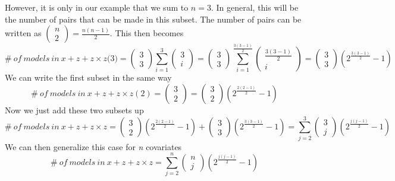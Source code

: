 However, it is only in our example that we sum to $n=3$. In general, this will be the number of pairs that can be made in this subset. The number of pairs can be written as $\left( \begin{array}{c}
n \\ 
2 \end{array}
\right)=\frac{n\left(n-1\right)}{2}$. This then becomes
\[\#\ of\ models\ in\ x + z + z \times z\textit{(3)}=\left( \begin{array}{c}
3 \\ 
3 \end{array}
\right)\sum^3_{i=1}{\left( \begin{array}{c}
3 \\ 
i \end{array}
\right)}=\left( \begin{array}{c}
3 \\ 
3 \end{array}
\right)\sum^{\frac{3\left(3-1\right)}{2}}_{i=1}{\left( \begin{array}{c}
\frac{3\left(3-1\right)}{2} \\ 
i \end{array}
\right)}=\left( \begin{array}{c}
3 \\ 
3 \end{array}
\right)\left(2^{\frac{3\left(3-1\right)}{2}}-1\right)\] 
We can write the first subset in the same way
\[\#\ of\ models\ in\ x + z + z \times z(2)=\left( \begin{array}{c}
3 \\ 
2 \end{array}
\right)=\left( \begin{array}{c}
3 \\ 
2 \end{array}
\right)\left(2^{\frac{2\left(2-1\right)}{2}}-1\right)\] 
Now we just add these two subsets up
\[\#\ of\ models\ in\ x + z + z \times z=\left( \begin{array}{c}
3 \\ 
2 \end{array}
\right)\left(2^{\frac{2\left(2-1\right)}{2}}-1\right)+\left( \begin{array}{c}
3 \\ 
3 \end{array}
\right)\left(2^{\frac{3\left(3-1\right)}{2}}-1\right)=\sum^3_{j=2}{\left( \begin{array}{c}
3 \\ 
j \end{array}
\right)\left(2^{\frac{j\left(j-1\right)}{2}}-1\right)}\] 
We can then generalize this case for \textit{n} covariates
\[\#\ of\ models\ in\ x + z+z \times z=\sum^n_{j=2}{\left( \begin{array}{c}
n \\ 
j \end{array}
\right)\left(2^{\frac{j\left(j-1\right)}{2}}-1\right)}\] 

